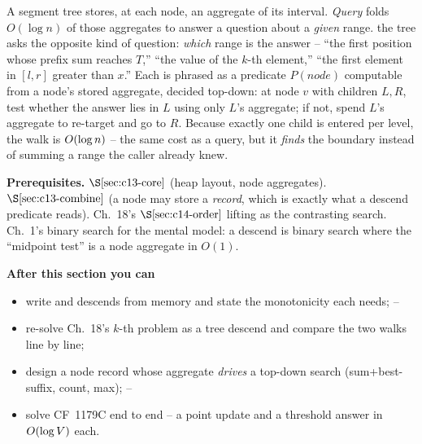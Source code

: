 \begin{topicintro}
A segment tree stores, at each node, an aggregate of its interval.  \emph{Query}
folds \(O(\log n)\) of those aggregates to answer a question about a
\emph{given} range.   the tree asks the opposite kind of
question: \emph{which} range is the answer -- ``the first position whose prefix
sum reaches \(T\),'' ``the value of the \(k\)-th element,'' ``the first element
in \([l,r]\) greater than \(x\).''  Each is phrased as a predicate \(P(\mathit{node})\)
computable from a node's stored aggregate, decided top-down: at node \(v\) with
children \(L,R\), test whether the answer lies in \(L\) using only \(L\)'s
aggregate; if not, spend \(L\)'s aggregate to re-target and go to \(R\).  Because
exactly one child is entered per level, the walk is \(O(\log n)\) -- the same
cost as a query, but it \emph{finds} the boundary instead of summing a range the
caller already knew.

\textbf{Prerequisites.} \(\secref{c13-core}\) (heap layout, node aggregates).
\(\secref{c13-combine}\) (a node may store a \emph{record}, which is exactly what
a descend predicate reads).  Ch.~18's \(\secref{c14-order}\) lifting as the
contrasting search.  Ch.~1's binary search for the mental model: a descend is
binary search where the ``midpoint test'' is a node aggregate in \(O(1)\).

\textbf{After this section you can}
\begin{itemize}[nosep]
  \item write  and  descends from memory and
        state the monotonicity each needs; \hfill{}--
  \item re-solve Ch.~18's \(k\)-th problem as a tree descend and compare the two
        walks line by line; \hfill{}
  \item design a node record whose aggregate \emph{drives} a top-down search
        (sum+best-suffix, count, max); \hfill{}--
  \item solve CF~1179C end to end -- a point update and a threshold answer in
        \(O(\log V)\) each. \hfill{}
\end{itemize}
\end{topicintro}

